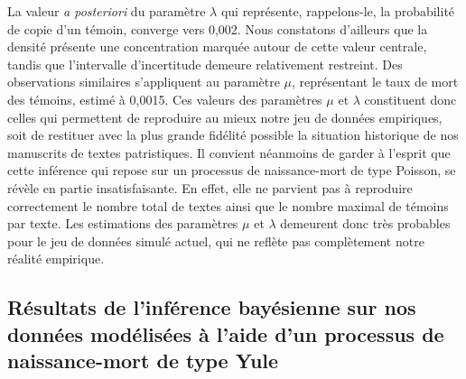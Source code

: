 \documentclass[a4paper,twoside,12pt]{book}
\begin{document}
La valeur \textit{a posteriori} du paramètre $\lambda$ qui représente, rappelons-le, la probabilité de copie d'un témoin, converge vers 0,002. Nous constatons d'ailleurs que la densité présente une concentration marquée autour de cette valeur centrale, tandis que l'intervalle d'incertitude demeure relativement restreint. Des observations similaires s'appliquent au paramètre $\mu$, représentant le taux de mort des témoins, estimé à 0,0015. Ces valeurs des paramètres $\mu$ et $\lambda$ constituent donc celles qui permettent de reproduire au mieux notre jeu de données empiriques, soit de restituer avec la plus grande fidélité possible la situation historique de nos manuscrits de textes patristiques. Il convient néanmoins de garder à l'esprit que cette inférence qui repose sur un processus de naissance-mort de type Poisson, se révèle en partie insatisfaisante. En effet, elle ne parvient pas à reproduire correctement le nombre total de textes ainsi que le nombre maximal de témoins par texte. Les estimations des paramètres $\mu$ et $\lambda$ demeurent donc très probables pour le jeu de données simulé actuel, qui ne reflète pas complètement notre réalité empirique.



\subsection{Résultats de l'inférence bayésienne sur nos données modélisées à l’aide d’un processus de naissance-mort de type Yule}
\end{document}
